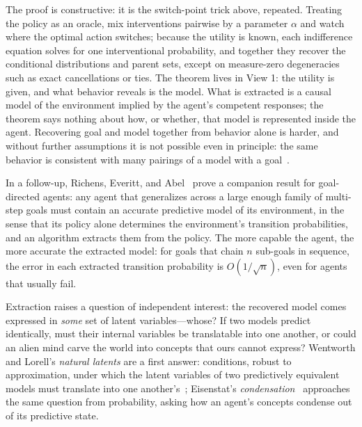The proof is constructive: it is the switch-point trick above, repeated. Treating the policy as an oracle, mix interventions pairwise by a parameter $\alpha$ and watch where the optimal action switches; because the utility is known, each indifference equation solves for one interventional probability, and together they recover the conditional distributions and parent sets, except on measure-zero degeneracies such as exact cancellations or ties. The theorem lives in View 1: the utility is given, and what behavior reveals is the model. What is extracted is a causal model of the environment implied by the agent's competent responses; the theorem says nothing about how, or whether, that model is represented inside the agent. Recovering goal and model together from behavior alone is harder, and without further assumptions it is not possible even in principle: the same behavior is consistent with many pairings of a model with a goal~\cite{armstrong2018}.

In a follow-up, Richens, Everitt, and Abel~\cite{richens2025general} prove a companion result for goal-directed agents: any agent that generalizes across a large enough family of multi-step goals must contain an accurate predictive model of its environment, in the sense that its policy alone determines the environment's transition probabilities, and an algorithm extracts them from the policy. The more capable the agent, the more accurate the extracted model: for goals that chain $n$ sub-goals in sequence, the error in each extracted transition probability is $O(1/\sqrt{n})$, even for agents that usually fail.

Extraction raises a question of independent interest: the recovered model comes expressed in \emph{some} set of latent variables---whose? If two models predict identically, must their internal variables be translatable into one another, or could an alien mind carve the world into concepts that ours cannot express? Wentworth and Lorell's \emph{natural latents} are a first answer: conditions, robust to approximation, under which the latent variables of two predictively equivalent models must translate into one another's~\cite{wentworth2025}; Eisenstat's \emph{condensation}~\cite{eisenstat2025} approaches the same question from probability, asking how an agent's concepts condense out of its predictive state.

